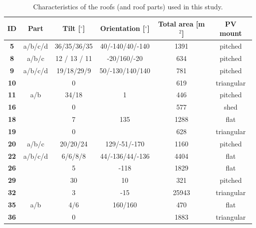 \begin{table}[thb]
\centering
\footnotesize
\caption{Characteristics of the roofs (and roof parts) used in this study.}
\label{tab:valid_roofs}
\begin{tabular}{cccccc}
\hline
\textbf{ID} & \textbf{Part} & \textbf{Tilt [$^\circ$]} & \textbf{Orientation [$^\circ$]} & \textbf{Total area [m$^2$]} & \textbf{PV mount} \\ \hline
\textbf{5}  & a/b/c/d       & 36/35/36/35           & 40/-140/40/-140              & 1391                         & pitched           \\
\textbf{8}  & a/b/c         & 12 / 13 / 11          & -20/160/-20                  & 634                          & pitched           \\
\textbf{9}  & a/b/c/d       & 19/18/29/9            & 50/-130/140/140              & 781                          & pitched           \\
\textbf{10} &               & 0                     &                              & 619                          & triangular        \\
\textbf{11} & a/b           & 34/18                 & 1                            & 446                          & pitched           \\
\textbf{16} &               & 0                     &                              & 577                          & shed              \\
\textbf{18} &               & 7                     & 135                          & 1288                         & flat              \\
\textbf{19} &               & 0                     &                              & 628                          & triangular        \\
\textbf{20} & a/b/c         & 20/20/24              & 129/-51/-170                 & 1160                         & pitched           \\
\textbf{22} & a/b/c/d       & 6/6/8/8               & 44/-136/44/-136              & 4404                         & flat              \\
\textbf{26} &               & 5                     & -118                         & 1829                         & flat              \\
\textbf{29} &               & 30                    & 10                           & 321                          & pitched           \\
\textbf{32} &               & 3                     & -15                          & 25943                        & triangular        \\
\textbf{35} & a/b           & 4/6                   & 160/160                      & 470                          & flat              \\
\textbf{36} &               & 0                     &                              & 1883                         & triangular        \\ \hline
\end{tabular}
\end{table}

